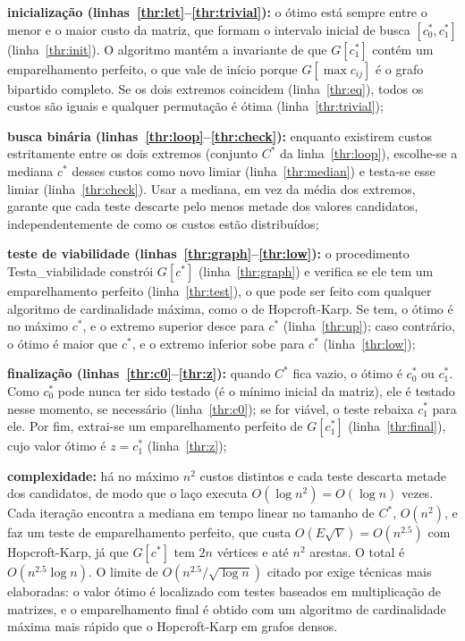 \begin{alineas}
    \item \textbf{inicialização (linhas~\ref{thr:let}--\ref{thr:trivial}):} o ótimo está sempre entre o menor e o maior custo da matriz, que formam o intervalo inicial de busca $[c_0^*, c_1^*]$ (linha~\ref{thr:init}). O algoritmo mantém a invariante de que $G[c_1^*]$ contém um emparelhamento perfeito, o que vale de início porque $G[\max c_{ij}]$ é o grafo bipartido completo. Se os dois extremos coincidem (linha~\ref{thr:eq}), todos os custos são iguais e qualquer permutação é ótima (linha~\ref{thr:trivial});
    \item \textbf{busca binária (linhas~\ref{thr:loop}--\ref{thr:check}):} enquanto existirem custos estritamente entre os dois extremos (conjunto $C^*$ da linha~\ref{thr:loop}), escolhe-se a mediana $c^*$ desses custos como novo limiar (linha~\ref{thr:median}) e testa-se esse limiar (linha~\ref{thr:check}). Usar a mediana, em vez da média dos extremos, garante que cada teste descarte pelo menos metade dos valores candidatos, independentemente de como os custos estão distribuídos;
    \item \textbf{teste de viabilidade (linhas~\ref{thr:graph}--\ref{thr:low}):} o procedimento Testa\_viabilidade constrói $G[c^*]$ (linha~\ref{thr:graph}) e verifica se ele tem um emparelhamento perfeito (linha~\ref{thr:test}), o que pode ser feito com qualquer algoritmo de cardinalidade máxima, como o de Hopcroft-Karp. Se tem, o ótimo é no máximo $c^*$, e o extremo superior desce para $c^*$ (linha~\ref{thr:up}); caso contrário, o ótimo é maior que $c^*$, e o extremo inferior sobe para $c^*$ (linha~\ref{thr:low});
    \item \textbf{finalização (linhas~\ref{thr:c0}--\ref{thr:z}):} quando $C^*$ fica vazio, o ótimo é $c_0^*$ ou $c_1^*$. Como $c_0^*$ pode nunca ter sido testado (é o mínimo inicial da matriz), ele é testado nesse momento, se necessário (linha~\ref{thr:c0}); se for viável, o teste rebaixa $c_1^*$ para ele. Por fim, extrai-se um emparelhamento perfeito de $G[c_1^*]$ (linha~\ref{thr:final}), cujo valor ótimo é $z = c_1^*$ (linha~\ref{thr:z});
    \item \textbf{complexidade:} há no máximo $n^2$ custos distintos e cada teste descarta metade dos candidatos, de modo que o laço executa $O(\log n^2) = O(\log n)$ vezes. Cada iteração encontra a mediana em tempo linear no tamanho de $C^*$, $O(n^2)$, e faz um teste de emparelhamento perfeito, que custa $O(E\sqrt{V}) = O(n^{2.5})$ com Hopcroft-Karp, já que $G[c^*]$ tem $2n$ vértices e até $n^2$ arestas. O total é $O(n^{2.5} \log n)$. O limite de $O(n^{2.5}/\sqrt{\log n})$ citado por  exige técnicas mais elaboradas: o valor ótimo é localizado com testes baseados em multiplicação de matrizes, e o emparelhamento final é obtido com um algoritmo de cardinalidade máxima mais rápido que o Hopcroft-Karp em grafos densos.
\end{alineas}

